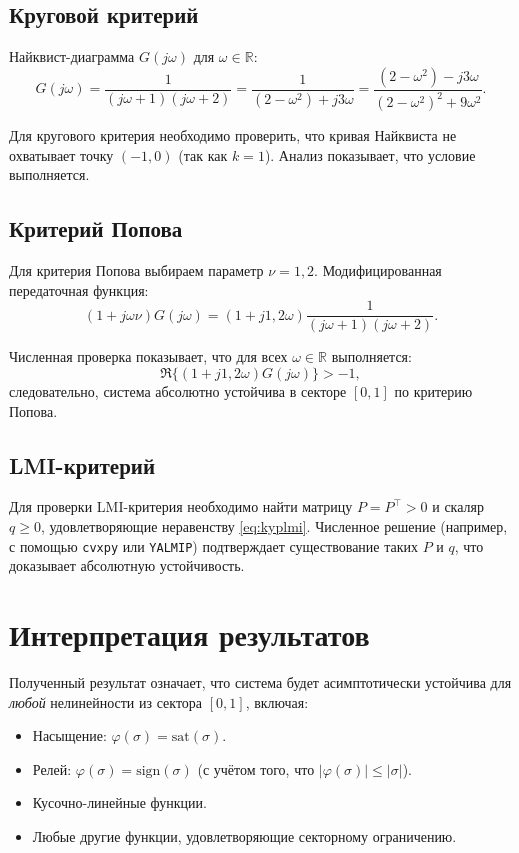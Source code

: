 \subsection{Круговой критерий}

Найквист-диаграмма $G(j\omega)$ для $\omega\in\mathbb{R}$:
\begin{equation}
    G(j\omega) = \frac{1}{(j\omega+1)(j\omega+2)} = \frac{1}{(2-\omega^2) + j3\omega} = \frac{(2-\omega^2) - j3\omega}{(2-\omega^2)^2 + 9\omega^2}.
\end{equation}

Для кругового критерия необходимо проверить, что кривая Найквиста не охватывает точку $(-1, 0)$ (так как $k=1$). Анализ показывает, что условие выполняется.

\subsection{Критерий Попова}

Для критерия Попова выбираем параметр $\nu = 1{,}2$. Модифицированная передаточная функция:
\begin{equation}
    (1+j\omega\nu)G(j\omega) = (1+j1{,}2\omega)\frac{1}{(j\omega+1)(j\omega+2)}.
\end{equation}

Численная проверка показывает, что для всех $\omega\in\mathbb{R}$ выполняется:
\begin{equation}
    \Re\big\{(1+j1{,}2\omega)G(j\omega)\big\} > -1,
\end{equation}
следовательно, система абсолютно устойчива в секторе $[0, 1]$ по критерию Попова.

\subsection{LMI-критерий}

Для проверки LMI-критерия необходимо найти матрицу $P=P^\top>0$ и скаляр $q\ge 0$, удовлетворяющие неравенству \eqref{eq:kyplmi}. Численное решение (например, с помощью \texttt{cvxpy} или \texttt{YALMIP}) подтверждает существование таких $P$ и $q$, что доказывает абсолютную устойчивость.

\section{Интерпретация результатов}

Полученный результат означает, что система будет асимптотически устойчива для \emph{любой} нелинейности из сектора $[0, 1]$, включая:
\begin{itemize}
    \item Насыщение: $\varphi(\sigma) = \mathrm{sat}(\sigma)$.
    \item Релей: $\varphi(\sigma) = \mathrm{sign}(\sigma)$ (с учётом того, что $|\varphi(\sigma)|\le|\sigma|$).
    \item Кусочно-линейные функции.
    \item Любые другие функции, удовлетворяющие секторному ограничению.
\end{itemize}

